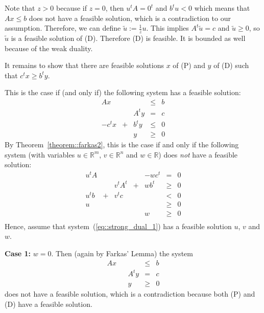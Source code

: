 \documentclass[12pt, showidx, twoside]{article}
\def\R{\mathbb{R}}
\begin{document}
{{{{Note that $z > 0$ because if $z=0$, then  $u^t A = 0^t$ and
$b^t u < 0$ which means that $A x \leq b$ does not have a feasible
solution, which is a contradiction to our assumption.
Therefore, we can define $\tilde u := \frac{1}{z}u$.
This implies $A^t \tilde u = c$ and $\tilde u \geq 0$, so $\tilde u$
is a feasible solution of (D). Therefore (D) is feasible. It is 
bounded as well because of the weak duality.

It remains to show that there are feasible solutions $x$ of (P) and
$y$ of (D) such that $c^t x \geq  b^t y$.




This is the case if (and only if) the following system 
has a feasible solution:
\[
\begin{array}{ccccc}
Ax     &   &       & \leq & b\\
       &   & A^t y &   =  & c\\
-c^t x & + & b^t y & \leq & 0\\
       &   &     y & \geq & 0
\end{array}
\]
By Theorem~\ref{theorem::farkas2}, this is the case if and only if
the following system (with variables $u \in \R^m$, $v \in \R^n$ and $w \in \R$)
does {\em not} have a feasible solution:
\begin{equation}\label{eq::strong_dual_1}
\begin{array}{ccccccc}
u^t A  &   &           &     &  -w c^t  &   =    & 0\\
       &   &  v^t A^t  &  +  &  w b^t   &  \geq  & 0\\
u^t b  & + & v^tc      &     &          &   <    & 0\\
u      &   &           &     &          &  \geq  & 0\\
       &   &           &     &  w       &  \geq  & 0\\
\end{array}
\end{equation}
Hence, assume that system~(\ref{eq::strong_dual_1}) has a feasible
solution $u$, $v$ and $w$.

{\bf Case 1:} $w = 0$. Then (again by Farkas' Lemma) the system 
\[
\begin{array}{ccccc}
Ax     &   &       & \leq & b\\
       &   & A^t y &   =  & c\\
       &   &     y & \geq & 0
\end{array}
\]
does not have a feasible solution, which is a contradiction because
both (P) and (D) have a feasible solution.

}}}}
\end{document}

